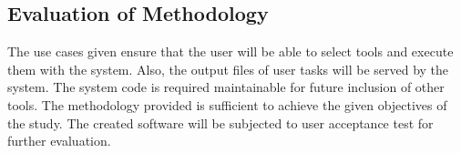 \documentclass[journal]{./IEEE/IEEEtran}
\begin{document}
    \subsection {Evaluation of Methodology}
    	The use cases given ensure that the user will be able to select tools and execute them with the system. Also, the output files of user tasks will be served by the system. The system code is required maintainable for future inclusion of other tools.  
        The methodology provided is sufficient to achieve the given objectives of the study. The created software will be subjected to user acceptance test for further evaluation. 
        
%
	
    
    
    
    
  	
\end{document}
